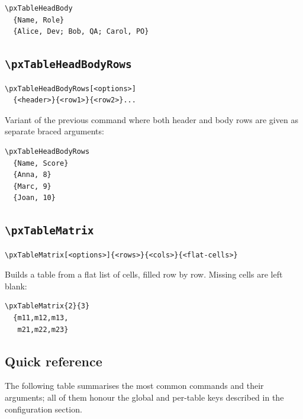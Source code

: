 \documentclass[11pt,a4paper]{article}
\begin{document}
\begin{verbatim}
\pxTableHeadBody
  {Name, Role}
  {Alice, Dev; Bob, QA; Carol, PO}
\end{verbatim}

\subsection{\texttt{\textbackslash pxTableHeadBodyRows}}

\begin{verbatim}
\pxTableHeadBodyRows[<options>]
  {<header>}{<row1>}{<row2>}...
\end{verbatim}

Variant of the previous command where both header and body rows are
given as separate braced arguments:

\begin{verbatim}
\pxTableHeadBodyRows
  {Name, Score}
  {Anna, 8}
  {Marc, 9}
  {Joan, 10}
\end{verbatim}

\subsection{\texttt{\textbackslash pxTableMatrix}}

\begin{verbatim}
\pxTableMatrix[<options>]{<rows>}{<cols>}{<flat-cells>}
\end{verbatim}

Builds a table from a flat list of cells, filled row by row.  Missing
cells are left blank:

\begin{verbatim}
\pxTableMatrix{2}{3}
  {m11,m12,m13,
   m21,m22,m23}
\end{verbatim}

\subsection{Quick reference}

The following table summarises the most common commands and their
arguments; all of them honour the global and per-table keys described in
the configuration section.
\end{document}
